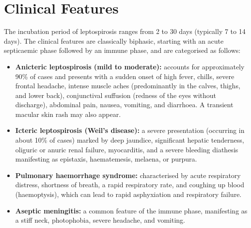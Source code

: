 \section*{Clinical Features}
The incubation period of leptospirosis ranges from 2 to 30 days (typically 7 to 14 days). The clinical features are classically biphasic, starting with an acute septicaemic phase followed by an immune phase, and are categorised as follows:
\begin{itemize}
    \item \textbf{Anicteric leptospirosis (mild to moderate):} accounts for approximately 90\% of cases and presents with a sudden onset of high fever, chills, severe frontal headache, intense muscle aches (predominantly in the calves, thighs, and lower back), conjunctival suffusion (redness of the eyes without discharge), abdominal pain, nausea, vomiting, and diarrhoea. A transient macular skin rash may also appear.
    \item \textbf{Icteric leptospirosis (Weil's disease):} a severe presentation (occurring in about 10\% of cases) marked by deep jaundice, significant hepatic tenderness, oliguric or anuric renal failure, myocarditis, and a severe bleeding diathesis manifesting as epistaxis, haematemesis, melaena, or purpura.
    \item \textbf{Pulmonary haemorrhage syndrome:} characterised by acute respiratory distress, shortness of breath, a rapid respiratory rate, and coughing up blood (haemoptysis), which can lead to rapid asphyxiation and respiratory failure.
    \item \textbf{Aseptic meningitis:} a common feature of the immune phase, manifesting as a stiff neck, photophobia, severe headache, and vomiting.
\end{itemize}

